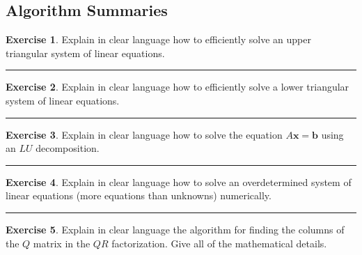 \documentclass[
]{book}
\theoremstyle{definition}
\theoremstyle{definition}
\theoremstyle{definition}
\newtheorem{exercise}{Exercise}[chapter]
\theoremstyle{remark}
\begin{document}
\hypertarget{algorithm-summaries-2}{%
\subsection{Algorithm Summaries}\label{algorithm-summaries-2}}

\begin{exercise}
\protect\hypertarget{exr:unnamed-chunk-373}{}{\label{exr:unnamed-chunk-373} }Explain in clear language how to efficiently solve an upper triangular
system of linear equations.
\end{exercise}

\begin{center}\rule{0.5\linewidth}{0.5pt}\end{center}

\begin{exercise}
\protect\hypertarget{exr:unnamed-chunk-374}{}{\label{exr:unnamed-chunk-374} }Explain in clear language how to efficiently solve a lower triangular
system of linear equations.
\end{exercise}

\begin{center}\rule{0.5\linewidth}{0.5pt}\end{center}

\begin{exercise}
\protect\hypertarget{exr:unnamed-chunk-375}{}{\label{exr:unnamed-chunk-375} }Explain in clear language how to solve the equation \(A \boldsymbol{x} = \boldsymbol{b}\) using an \(LU\) decomposition.
\end{exercise}

\begin{center}\rule{0.5\linewidth}{0.5pt}\end{center}

\begin{exercise}
\protect\hypertarget{exr:unnamed-chunk-376}{}{\label{exr:unnamed-chunk-376} }Explain in clear language how to solve an overdetermined system of linear equations (more equations than unknowns) numerically.
\end{exercise}

\begin{center}\rule{0.5\linewidth}{0.5pt}\end{center}

\begin{exercise}
\protect\hypertarget{exr:unnamed-chunk-377}{}{\label{exr:unnamed-chunk-377} }Explain in clear language the algorithm for finding the columns of the \(Q\) matrix in the \(QR\) factorization. Give all of the mathematical details.
\end{exercise}
\end{document}
